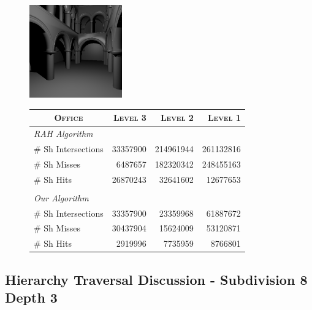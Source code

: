 \begin{figure}[!htb]
    \begin{minipage}{0.25\linewidth}
        \centering
        \includegraphics[width=4.0cm]{Images/Sponza_Preview}
    \end{minipage}
    \begin{minipage}{0.725\linewidth}
        \centering
        \fontsize{8}{10}
        \selectfont
        \begin{tabular}[h]{l|rrr}
            \multicolumn{1}{c|}{\textsc{Office}} & \textsc{Level 3} & \textsc{Level 2} & \textsc{Level 1}\\
            \hline
            \emph{RAH Algorithm} & & \\
            \hline
            \quad \# Sh Intersections  & 33357900   & 214961944	& 261132816	\\
            \quad \# Sh Misses            & 6487657	& 182320342	& 248455163	\\
            \quad \# Sh Hits              & 26870243	& 32641602	& 12677653	\\
            & & \\
            \hline
            \emph{Our Algorithm} & & \\
            \hline
            \quad \# Sh Intersections   & 33357900	& 23359968	& 61887672	\\
            \quad \# Sh Misses          & 30437904	& 15624009	& 53120871	\\
            \quad \# Sh Hits            & 2919996	& 7735959	& 8766801	\\
        \end{tabular}
        \label{table:sponza-d8-n3-results}
    \end{minipage}
\end{figure}

\subsection{Hierarchy Traversal Discussion - Subdivision 8 Depth 3}

